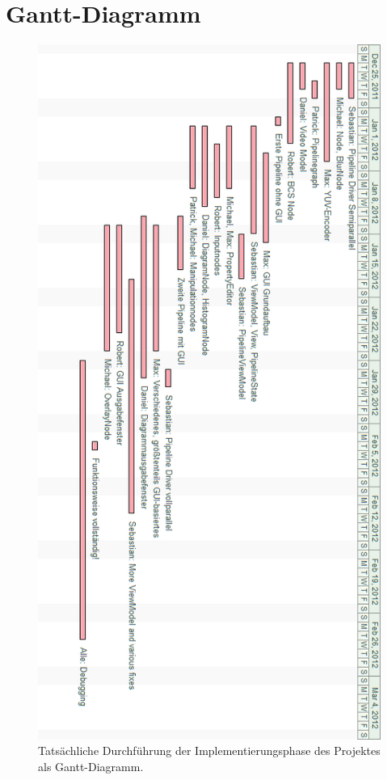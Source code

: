 \section{Gantt-Diagramm}

\begin{figure}[h!]
\begin{center}
\includegraphics[height=0.7\textheight]{gantt.png}
\end{center}
\caption{Tatsächliche Durchführung der Implementierungsphase des Projektes als Gantt-Diagramm.}
\end{figure}
